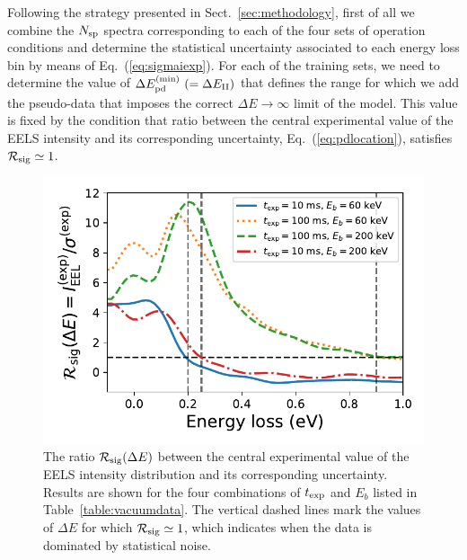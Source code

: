Following the strategy presented in Sect.~\ref{sec:methodology}, first of all we combine the $N_{\rm sp}$ spectra
corresponding to each of the four sets of operation conditions and determine the statistical uncertainty
associated to each energy loss bin by means of Eq.~(\ref{eq:sigmaiexp}).
%
For each of the training sets, we need to determine the value
of $\Delta E_{\rm pd}^{\rm (min)}~(=\Delta E_{\rm II})$
that defines the range for which we add the  pseudo-data
that imposes the correct $\Delta E \to \infty$ limit of the model.
%
This value is fixed by the condition that
ratio between the central experimental value of the 
EELS intensity and its corresponding uncertainty,
Eq.~(\ref{eq:pdlocation}), satisfies $\mathcal{R}_{\rm sig}\simeq 1$.
      
\begin{figure}[t]
  \centering
  \includegraphics[width=125mm]{plots/intensity_to_error_ratio.pdf}
  \caption{\small The ratio $\mathcal{R}_{\rm sig}(\Delta E)$
    between the central experimental value of the 
    EELS intensity distribution and its corresponding
    uncertainty.
    Results are shown for the four combinations of $t_{\rm exp}$
    and $E_{b}$ listed in Table~\ref{table:vacuumdata}.
    The vertical dashed lines mark the values of $\Delta E$ for which
    $\mathcal{R}_{\rm sig}\simeq 1$, which indicates when the
    data is dominated by statistical noise.
  }
  \label{fig:intensityratio}
\end{figure}

